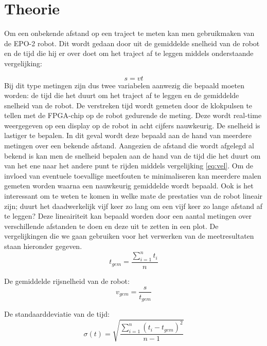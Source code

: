\documentclass{report}
\begin{document}
\chapter{Theorie}
Om een onbekende afstand op een traject te meten kan men gebruikmaken van de EPO-2 robot. Dit wordt gedaan door uit de gemiddelde snelheid van de robot en de tijd 
die hij er over doet om het traject af te leggen middels onderstaande vergelijking:

\begin{equation}
	\label{eq:vel}
	s = vt
\end{equation}
\noindent
Bij dit type metingen zijn dus twee variabelen aanwezig die bepaald moeten worden: de tijd die het duurt om het traject af te leggen en de gemiddelde snelheid van de robot. 
De verstreken tijd wordt gemeten door de klokpulsen te tellen met de FPGA-chip op de robot gedurende de meting. Deze wordt real-time weergegeven op een display op de robot in acht cijfers nauwkeurig.
De snelheid is lastiger te bepalen. In dit geval wordt deze bepaald aan de hand van meerdere metingen over een bekende afstand. Aangezien de afstand die wordt afgelegd al bekend is kan men de snelheid bepalen aan de hand van de tijd die het duurt om van het ene naar het andere punt te rijden middels vergelijking \ref{eq:vel}. 
Om de invloed van eventuele toevallige meetfouten te minimaliseren kan meerdere malen gemeten worden waarna een nauwkeurig gemiddelde wordt bepaald. Ook is het interessant om te weten te komen in welke mate de prestaties van de robot lineair zijn; duurt het daadwerkelijk vijf keer zo lang om een vijf keer zo lange afstand af te leggen? Deze lineairiteit kan bepaald worden door een aantal metingen over verschillende afstanden te doen en deze uit te zetten in een plot. De vergelijkingen die we gaan gebruiken voor het verwerken van de meetresultaten staan hieronder gegeven.\\

\begin{equation}
\label{eq:avgTime}
	t_{gem}=\frac{\sum_{i=1}^{n}t_i}{n}
\end{equation}

\noindent
De gemiddelde rijsnelheid van de robot:
\begin{equation}
\label{eq:avgVel}
	v_{gem} = \frac{s}{t_{gem}}
\end{equation}

\noindent
De standaarddeviatie van de tijd: \cite{epo1-onzekerheden}
\begin{equation}
\label{eq:standaardDev}
	\sigma(t) = \sqrt{\frac{\sum_{i=1}^{n}( t_i-t_{gem})^2}{n-1}}
\end{equation}
\end{document}

